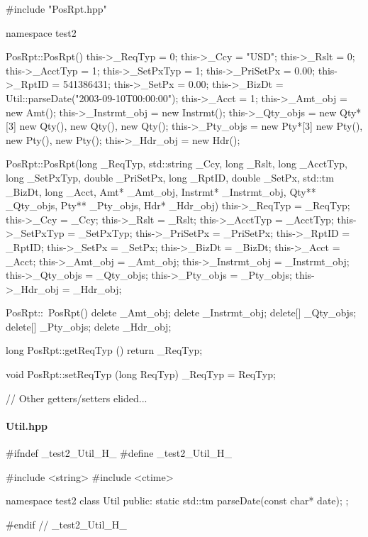 \documentclass[submission]{eptcs}
\begin{document}
\begin{cppcode}
#include "PosRpt.hpp"

namespace test2 {
  PosRpt::PosRpt() {
    this->_ReqTyp = 0;
    this->_Ccy = "USD";
    this->_Rslt = 0;
    this->_AcctTyp = 1;
    this->_SetPxTyp = 1;
    this->_PriSetPx = 0.00;
    this->_RptID = 541386431;
    this->_SetPx = 0.00;
    this->_BizDt = Util::parseDate("2003-09-10T00:00:00");
    this->_Acct = 1;
    this->_Amt_obj = new Amt();
    this->_Instrmt_obj = new Instrmt();
    this->_Qty_objs = new Qty*[3] {new Qty(), new Qty(), new Qty()};
    this->_Pty_objs = new Pty*[3] {new Pty(), new Pty(), new Pty()};
    this->_Hdr_obj = new Hdr();
  }

  PosRpt::PosRpt(long _ReqTyp, std::string _Ccy, long _Rslt, long _AcctTyp, long _SetPxTyp, double _PriSetPx,
                 long _RptID, double _SetPx, std::tm _BizDt, long _Acct, Amt* _Amt_obj, Instrmt* _Instrmt_obj,
                 Qty** _Qty_objs, Pty** _Pty_objs, Hdr* _Hdr_obj) {
    this->_ReqTyp = _ReqTyp;
    this->_Ccy = _Ccy;
    this->_Rslt = _Rslt;
    this->_AcctTyp = _AcctTyp;
    this->_SetPxTyp = _SetPxTyp;
    this->_PriSetPx = _PriSetPx;
    this->_RptID = _RptID;
    this->_SetPx = _SetPx;
    this->_BizDt = _BizDt;
    this->_Acct = _Acct;
    this->_Amt_obj = _Amt_obj;
    this->_Instrmt_obj = _Instrmt_obj;
    this->_Qty_objs = _Qty_objs;
    this->_Pty_objs = _Pty_objs;
    this->_Hdr_obj = _Hdr_obj;
  }

  PosRpt::~PosRpt() {
    delete _Amt_obj;
    delete _Instrmt_obj;
    delete[] _Qty_objs;
    delete[] _Pty_objs;
    delete _Hdr_obj;
  }

  long PosRpt::getReqTyp () {
    return _ReqTyp;
  }

  void PosRpt::setReqTyp (long ReqTyp) {
    _ReqTyp = ReqTyp;
  }

  // Other getters/setters elided...
}
\end{cppcode}

\paragraph{Util.hpp}

\begin{cppcode}
#ifndef _test2_Util_H_
#define _test2_Util_H_

#include <string>
#include <ctime>

namespace test2 {
  class Util {
  public:
    static std::tm parseDate(const char* date);
  };
}

#endif // _test2_Util_H_
\end{cppcode}
\end{document}

